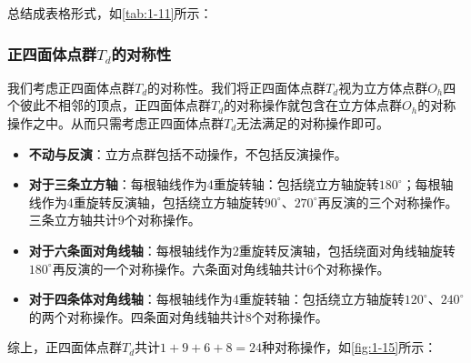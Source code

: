     总结成表格形式，如\autoref{tab:1-11}所示：
    \begin{table}[!htbp]
        \centering
        \caption{立方点群$O_h$的对称性}
        \label{tab:1-11}
    \end{table}

\subsubsection{正四面体点群$T_d$的对称性}
    我们考虑正四面体点群$T_d$的对称性。我们将正四面体点群$T_d$视为立方体点群$O_h$四个彼此不相邻的顶点，正四面体点群$T_d$的对称操作就包含在立方体点群$O_h$的对称操作之中。从而只需考虑正四面体点群$T_d$无法满足的对称操作即可。
    \begin{itemize}[itemsep=0pt,parsep=0pt]
        \item \textbf{不动与反演}：立方点群包括不动操作，不包括反演操作。
        \item \textbf{对于三条立方轴}：每根轴线作为4重旋转轴：包括绕立方轴旋转$180^{\circ}$；每根轴线作为4重旋转反演轴，包括绕立方轴旋转$90^{\circ}$、$270^{\circ}$再反演的三个对称操作。三条立方轴共计9个对称操作。
        \item \textbf{对于六条面对角线轴}：每根轴线作为2重旋转反演轴，包括绕面对角线轴旋转$180^{\circ}$再反演的一个对称操作。六条面对角线轴共计6个对称操作。
        \item \textbf{对于四条体对角线轴}：每根轴线作为4重旋转轴：包括绕立方轴旋转$120^{\circ}$、$240^{\circ}$的两个对称操作。四条面对角线轴共计8个对称操作。
    \end{itemize}
    综上，正四面体点群$T_d$共计$1+9+6+8=24$种对称操作，如\autoref{fig:1-15}所示：

